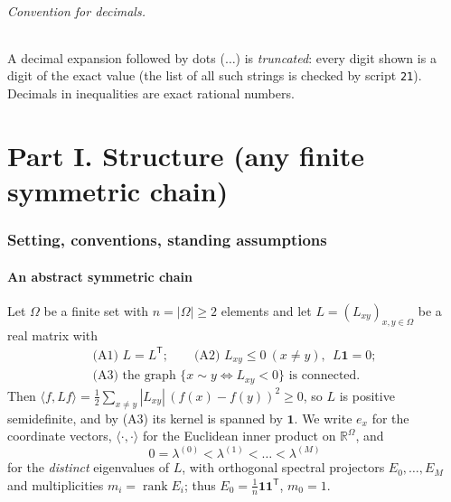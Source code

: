 \documentclass[11pt,a4paper]{article}
\newcommand{\one}{\mathbf 1}
\newcommand{\R}{\mathbb R}
\newcommand{\ip}[2]{\langle #1,#2\rangle}
\theoremstyle{plain}
\theoremstyle{definition}
\numberwithin{equation}{section}
\begin{document}
\paragraph{Convention for decimals.} A decimal expansion followed by dots ($\ldots$) is \emph{truncated}: every digit shown is a digit of the exact value (the list of all such strings is checked by script \texttt{21}). Decimals in inequalities are exact rational numbers.

\tableofcontents
\bigskip
\part*{Part I. Structure (any finite symmetric chain)}
\section{Setting, conventions, standing assumptions}\label{sec:setting}

\subsection{An abstract symmetric chain}
Let $\Omega$ be a finite set with $n=|\Omega|\ge 2$ elements and let $L=(L_{xy})_{x,y\in\Omega}$ be a real matrix with
\begin{equation}\label{eq:A}
\begin{gathered}\text{(A1) } L=L^{\mathsf T};\qquad \text{(A2) } L_{xy}\le 0\ (x\ne y),\ \ L\one=0;\\
\text{(A3) the graph } \{x\sim y \iff L_{xy}<0\}\text{ is connected.}\end{gathered}
\end{equation}
Then $\ip f{Lf}=\tfrac12\sum_{x\neq y}|L_{xy}|\,(f(x)-f(y))^2\ge 0$, so $L$ is positive semidefinite, and by (A3) its kernel is spanned by $\one$. We write $e_x$ for the coordinate vectors, $\ip\cdot\cdot$ for the Euclidean inner product on $\R^\Omega$, and
\[
0=\lambda^{(0)}<\lambda^{(1)}<\dots<\lambda^{(M)}
\]
for the \emph{distinct} eigenvalues of $L$, with orthogonal spectral projectors $E_0,\dots,E_M$ and multiplicities $m_i=\operatorname{rank}E_i$; thus $E_0=\frac1n\one\one^{\mathsf T}$, $m_0=1$.
\end{document}
